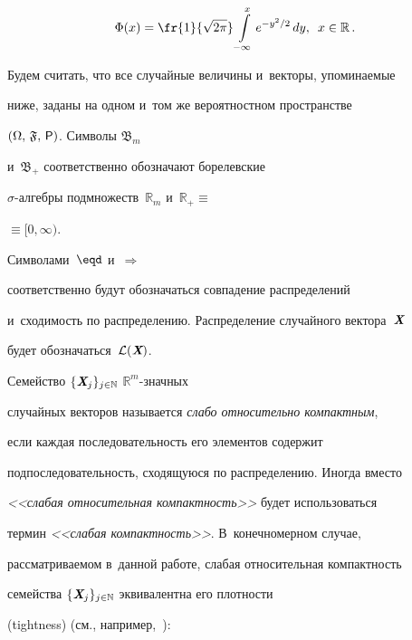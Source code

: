 \noindent


$$


\Phi(x)=\fr{1}{\sqrt{2\pi}}\int\limits_{-\infty}^{x}e^{-y^2/2}\,dy,\enskip


x\in\mathbb{R}\,.


$$











Будем считать, что все случайные величины и~векторы, упоминаемые


ниже, заданы на одном и~том же вероятностном пространстве


$(\Omega,\,\mathfrak{F},\,{\sf P})$. Символы $\mathfrak{B}_m$


и~$\mathfrak{B}_+$ соответственно обозначают борелевские


$\sigma$-ал\-геб\-ры подмножеств~$\mathbb{R}_m$ и~$\mathbb{R}_+\equiv$\linebreak


$\equiv


[0,\infty)$.


Символами~$\eqd$ и~$\Longrightarrow$


соответственно будут обозначаться совпадение распределений


и~сходимость по распределению. Распределение случайного вектора~$\emph{\textbf{X}}$


будет обозначаться~$\mathcal{L}(\emph{\textbf{X}})$.





Семейство $\{\emph{\textbf{X}}_j\}_{j\in\mathbb{N}}$ $\mathbb{R}^m$-знач\-ных


случайных векторов называется {\it слабо относительно компактным},


если каждая последовательность его элементов содержит


подпоследовательность, сходящуюся по распределению. Иногда вместо


{\it <<слабая относительная компактность>>} будет использоваться


термин {\it <<слабая компактность>>}. В~конечномерном случае,


рассматриваемом в~данной работе, слабая относительная компактность


семейства $\{\emph{\textbf{X}}_j\}_{j\in\mathbb{N}}$ эквивалентна его плотности


(tightness) (см., например,~\cite{Loeve1977}):





